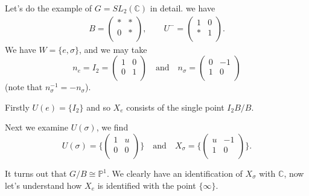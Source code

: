 \documentclass[12pt]{article}
\theoremstyle{plain}
\theoremstyle{definition}
\numberwithin{equation}{section}
\newcommand{\C}{\mathbb{C}}
\newcommand{\bbP}{\mathbb{P}}
\begin{document}
Let's do the example of $G = SL_2(\C)$ in detail. we have
\begin{align*}
B = \left(
\begin{array}{cc}
* & * \\
0 & * \\
\end{array}
\right), \qquad
%
U^- = \left(
\begin{array}{cc}
1 & 0 \\
* & 1 \\
\end{array}
\right).
\end{align*}
We have $W = \{e, \sigma\}$, and we may take
\[
n_e = I_2 =
\left(
\begin{array}{cc}
1 & 0 \\
0 & 1 \\
\end{array}
\right)
%
\quad \text{and} \quad
%
n_\sigma =
\left(
\begin{array}{cc}
0 & -1 \\
1 & 0 \\
\end{array}
\right)
\]
(note that $n_\sigma^{-1} = -n_\sigma$).

Firstly $U(e) = \{I_2\}$ and so $X_e$ consists of the single point $I_2 B / B$.

Next we examine $U(\sigma)$, we find
\[
U(\sigma) =
\{\left(
\begin{array}{cc}
1 & u \\
0 & 0 \\
\end{array}
\right)\}
%
\quad \text{and} \quad
%
X_\sigma =
\{\left(
\begin{array}{cc}
u & -1 \\
1 & 0 \\
\end{array}
\right)\}.
\]

It turns out that $G / B \cong \bbP^1$. We clearly have an identification of $X_\sigma$ with $\C$, now let's understand how $X_e$ is identified with the point $\{\infty\}$.
\end{document}
